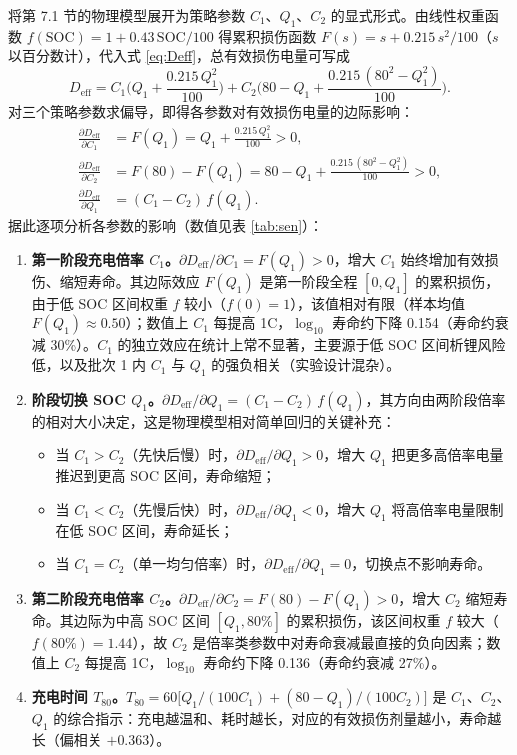 \documentclass[withoutpreface]{cumcmthesis}
\begin{document}
将第 7.1 节的物理模型展开为策略参数 $C_1$、$Q_1$、$C_2$ 的显式形式。由线性权重函数 $f(\mathrm{SOC})=1+0.43\,\mathrm{SOC}/100$ 得累积损伤函数 $F(s)=s+0.215\,s^2/100$（$s$ 以百分数计），代入式 \eqref{eq:Deff}，总有效损伤电量可写成
\begin{equation}\label{eq:Deff-expand}
D_{\mathrm{eff}} = C_1\Big(Q_1+\frac{0.215\,Q_1^2}{100}\Big) + C_2\Big(80-Q_1+\frac{0.215\,(80^2-Q_1^2)}{100}\Big).
\end{equation}
对三个策略参数求偏导，即得各参数对有效损伤电量的边际影响：
\begin{align}
\frac{\partial D_{\mathrm{eff}}}{\partial C_1} &= F(Q_1)=Q_1+\frac{0.215\,Q_1^2}{100}>0,\\
\frac{\partial D_{\mathrm{eff}}}{\partial C_2} &= F(80)-F(Q_1)=80-Q_1+\frac{0.215\,(80^2-Q_1^2)}{100}>0,\\
\frac{\partial D_{\mathrm{eff}}}{\partial Q_1} &= (C_1-C_2)\,f(Q_1).
\end{align}
据此逐项分析各参数的影响（数值见表 \ref{tab:sen}）：
\begin{enumerate}
\item \textbf{第一阶段充电倍率 $C_1$。}$\partial D_{\mathrm{eff}}/\partial C_1=F(Q_1)>0$，增大 $C_1$ 始终增加有效损伤、缩短寿命。其边际效应 $F(Q_1)$ 是第一阶段全程 $[0,Q_1]$ 的累积损伤，由于低 SOC 区间权重 $f$ 较小（$f(0)=1$），该值相对有限（样本均值 $F(Q_1)\approx0.50$）；数值上 $C_1$ 每提高 1C，$\log_{10}$ 寿命约下降 0.154（寿命约衰减 30\%）。$C_1$ 的独立效应在统计上常不显著，主要源于低 SOC 区间析锂风险低，以及批次 1 内 $C_1$ 与 $Q_1$ 的强负相关（实验设计混杂）。
\item \textbf{阶段切换 SOC $Q_1$。}$\partial D_{\mathrm{eff}}/\partial Q_1=(C_1-C_2)\,f(Q_1)$，其方向由两阶段倍率的相对大小决定，这是物理模型相对简单回归的关键补充：
\begin{itemize}
\item 当 $C_1>C_2$（先快后慢）时，$\partial D_{\mathrm{eff}}/\partial Q_1>0$，增大 $Q_1$ 把更多高倍率电量推迟到更高 SOC 区间，寿命缩短；
\item 当 $C_1<C_2$（先慢后快）时，$\partial D_{\mathrm{eff}}/\partial Q_1<0$，增大 $Q_1$ 将高倍率电量限制在低 SOC 区间，寿命延长；
\item 当 $C_1=C_2$（单一均匀倍率）时，$\partial D_{\mathrm{eff}}/\partial Q_1=0$，切换点不影响寿命。
\end{itemize}
\item \textbf{第二阶段充电倍率 $C_2$。}$\partial D_{\mathrm{eff}}/\partial C_2=F(80)-F(Q_1)>0$，增大 $C_2$ 缩短寿命。其边际为中高 SOC 区间 $[Q_1,80\%]$ 的累积损伤，该区间权重 $f$ 较大（$f(80\%)=1.44$），故 $C_2$ 是倍率类参数中对寿命衰减最直接的负向因素；数值上 $C_2$ 每提高 1C，$\log_{10}$ 寿命约下降 0.136（寿命约衰减 27\%）。
\item \textbf{充电时间 $T_{80}$。}$T_{80}=60\big[Q_1/(100C_1)+(80-Q_1)/(100C_2)\big]$ 是 $C_1$、$C_2$、$Q_1$ 的综合指示：充电越温和、耗时越长，对应的有效损伤剂量越小，寿命越长（偏相关 $+0.363$）。
\end{enumerate}
\end{document}
